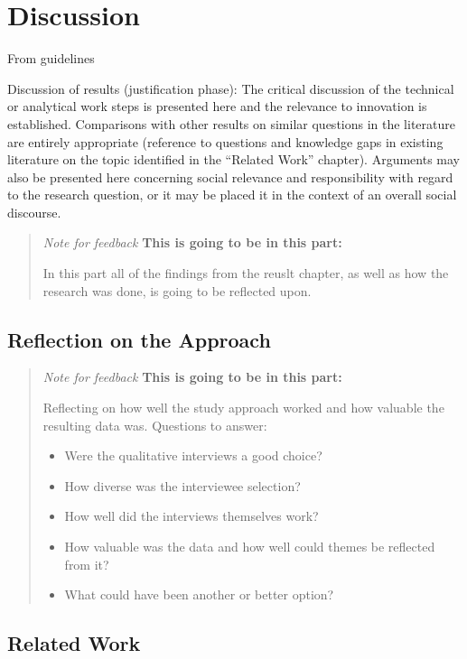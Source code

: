 \section{Discussion}

From guidelines

Discussion of results (justification phase): The critical discussion of the technical or analytical work steps is
presented here and the relevance to innovation is established. Comparisons with other results on similar
questions in the literature are entirely appropriate (reference to questions and knowledge gaps in existing
literature on the topic identified in the “Related Work” chapter). Arguments may also be presented here
concerning social relevance and responsibility with regard to the research question, or it may be placed it in
the context of an overall social discourse. 

\blockquote{
\textit{Note for feedback}
\textbf{This is going to be in this part:}

In this part all of the findings from the reuslt chapter, as well as how the research was done, is going to be reflected upon.

}

\subsection{Reflection on the Approach}

\blockquote{
\textit{Note for feedback}
\textbf{This is going to be in this part:}

Reflecting on how well the study approach worked and how valuable the resulting data was. Questions to answer:

\begin{itemize}
  \item{Were the qualitative interviews a good choice?}
  \item{How diverse was the interviewee selection?}
  \item{How well did the interviews themselves work?}
  \item{How valuable was the data and how well could themes be reflected from it?}
  \item{What could have been another or better option?}
\end{itemize}

}

\subsection{Related Work}

